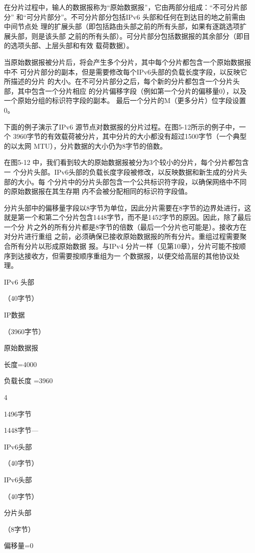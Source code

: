 在分片过程中，输人的数据报称为“原始数据报”，它由两部分组成：“不可分片部分”
和“可分片部分”。不可分片部分包括IPv6 头部和任何在到达目的地之前需由中间节点处
理的扩展头部（即包括路由头部之前的所有头部，如果有逐跳选项扩展头部，则是该头部
之前的所有头部）。可分片部分包括数据报的其余部分（即目的选项头部、上层头部和有效
载荷数据）。

当原始数据报被分片后，将会产生多个分片，其中每个分片都包含一个原始数据报中不
可分片部分的副本，但是需要修改每个IPv6头部的负载长度字段，以反映它所描述的分片
的大小。在不可分片部分之后，每个新的分片都包含一个分片头部，其中包含一个分片相应
的分片偏移字段（例如第一个分片的偏移量0），以及一个原始分组的标识符字段的副本。
最后一个分片的M（更多分片）位字段设置 0。

下面的例子演示了IPv6 源节点对数据报的分片过程。在图5-12所示的例子中，一个
3960字节的有效载荷被分片，其中分片的大小都没有超过1500字节（一个典型的以太网
MTU），分片数据的大小仍为8字节的倍数。

在图5-12 中，我们看到较大的原始数据报被分为3个较小的分片，每个分片都包含一
个分片头部。IPv6头部的负载长度字段被修改，以反映数据和新生成的分片头部的大小。每
个分片中的分片头部包含一个公共标识符字段，以确保网络中不同的原始数据报在其生存期
内不会被分配相同的标识符字段值。

分片头部中的偏移量字段以8字节为单位，因此分片需要在8字节的边界处进行，这
就是第一个和第二个分片包含1448字节，而不是1452字节的原因。因此，除了最后一个分
片之外的所有分片都是8字节的倍数（最后一个分片也可能是）。接收方在对分片进行重组
之前，必须确保已接收原始数据报的所有分片。重组过程需要聚合所有分片以形成原始数据
报。与IPv4 分片一样（见第10章），分片可能不按顺序到达接收方，但需要按顺序重组为一
个数据报，以便交给高层的其他协议处理。

IPv6 头部

（40字节）

IP数据

（3960字节）

原始数据报

长度=4000

负载长度 =3960

4

1496字节

1448字节—

IPv6头部

（40字节）

IPv6头部

（40字节）

分片头部

（8字节）

偏移量=0

